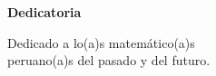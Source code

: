 
\begin{dedication}
	\normalsize\textbf{Dedicatoria}

	Dedicado a lo(a)s matemático(a)s \\
	peruano(a)s del pasado y del futuro.
\end{dedication}
